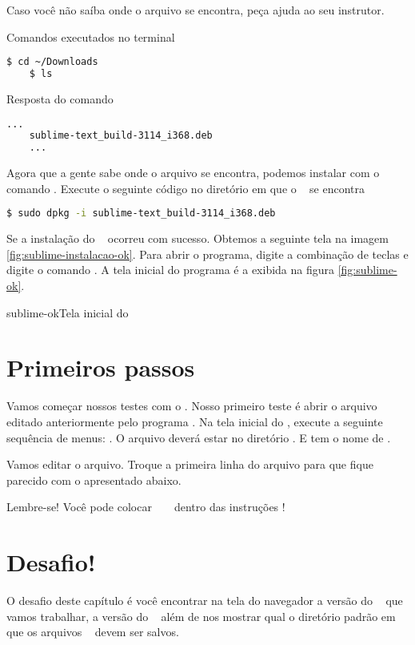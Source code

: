 Caso você não saíba onde o arquivo se encontra, peça ajuda ao seu instrutor.

\begin{multicols}{2}

  Comandos executados no terminal 
  \begin{lstlisting}[language=bash,style=codigos]
    $ cd ~/Downloads
    $ ls
  \end{lstlisting}

  \columnbreak

  Resposta do comando \comandolscompleto
  \begin{lstlisting}[language=bash, style=codigos]
    ...  
    sublime-text_build-3114_i368.deb
    ...  
  \end{lstlisting}

\end{multicols}

Agora que a gente sabe onde o arquivo se encontra, podemos instalar com o comando
\dpkg. Execute o seguinte código no diretório em que o \sublimefilename~ se encontra

  \begin{lstlisting}[language=bash,style=codigos]
    $ sudo dpkg -i sublime-text_build-3114_i368.deb
  \end{lstlisting}

Se a instalação do \sublime~ ocorreu com sucesso. Obtemos a seguinte tela na imagem \ref{fig:sublime-instalacao-ok}.
Para abrir o programa, digite a combinação de teclas \altfdois e digite o comando \sublimebin.
A tela inicial do programa é a exibida na figura \ref{fig:sublime-ok}.

{sublime-ok}{Tela inicial do \sublime}

\section{Primeiros passos}
\label{primeiros-passos}

Vamos começar nossos testes com o \sublime. Nosso primeiro teste é abrir o arquivo 
editado anteriormente pelo programa \gedit. Na tela inicial do \sublime, execute a seguinte
sequência de menus: . O arquivo deverá estar no diretório
. E tem o nome de .

Vamos editar o arquivo. Troque a primeira linha do arquivo para que fique parecido com o
apresentado abaixo.



Lembre-se! Você pode colocar \tags~ \html~ dentro das instruções \php!

\section{Desafio!}
\label{desafio}
O desafio deste capítulo é você encontrar na tela do navegador a versão do \php~
que vamos trabalhar, a versão do \apache~ além de nos mostrar qual o diretório
padrão em que os arquivos \phpextensao~ devem ser salvos.